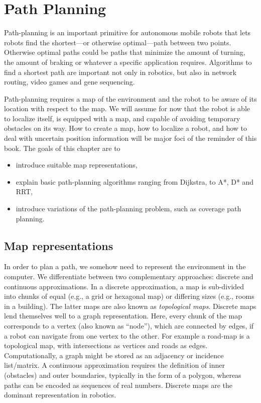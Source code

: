 \chapter{Path Planning}\label{chap:pathplanning}
Path-planning is an important primitive for autonomous mobile robots that lets robots find the shortest---or otherwise optimal---path between two points. Otherwise optimal paths could be paths that minimize the amount of turning, the amount of braking or whatever a specific application requires. Algorithms to find a shortest path are important not only in robotics, but also in network routing, video games and gene sequencing.

Path-planning requires a map of the environment and the robot to be aware of its location with respect to the map. We will assume for now that the robot is able to localize itself,  is equipped with a map, and capable of avoiding temporary obstacles on its way. How to create a map, how to localize a robot, and how to deal with uncertain position information will be major foci of the reminder of this  book. The goals of this chapter are to

\begin{itemize}
\item introduce suitable map representations,
\item explain basic path-planning algorithms  ranging from Dijkstra, to A*, D* and RRT,
\item introduce variations of the path-planning problem, such as coverage path planning.
\end{itemize}

\section{Map representations}\label{sec:maps}
In order to plan a path, we somehow need to represent the environment in the computer. We differentiate between two complementary approaches: discrete and continuous approximations. In a discrete approximation, a map is sub-divided into chunks of equal (e.g., a grid or hexagonal map) or differing sizes (e.g., rooms in a building). The latter maps are also known as \emph{topological maps}. Discrete maps lend themselves well to a graph representation. Here, every chunk of the map corresponds to a vertex (also known as ``node''), which are connected by edges, if a robot can navigate from one vertex to the other. For example a road-map is a topological map, with intersections as vertices and roads as edges. Computationally, a graph might be stored as an adjacency or incidence list/matrix. A continuous approximation requires the definition of inner (obstacles) and outer boundaries, typically in the form of a polygon, whereas paths can be encoded as sequences of real numbers. Discrete maps are the dominant representation in robotics.

